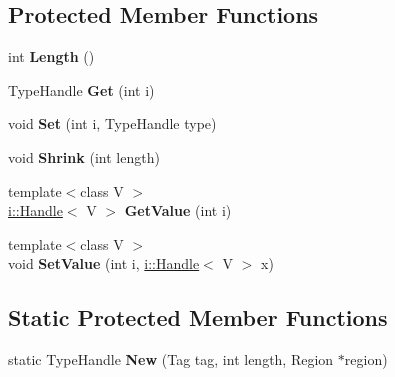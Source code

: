\subsection*{Protected Member Functions}
\begin{DoxyCompactItemize}
\item 
\hypertarget{classv8_1_1internal_1_1_type_impl_1_1_structural_type_a425763509c468842d8493e384ac93500}{}int {\bfseries Length} ()\label{classv8_1_1internal_1_1_type_impl_1_1_structural_type_a425763509c468842d8493e384ac93500}

\item 
\hypertarget{classv8_1_1internal_1_1_type_impl_1_1_structural_type_a2bdaac878b4120bf9585b1ac4092dd19}{}Type\+Handle {\bfseries Get} (int i)\label{classv8_1_1internal_1_1_type_impl_1_1_structural_type_a2bdaac878b4120bf9585b1ac4092dd19}

\item 
\hypertarget{classv8_1_1internal_1_1_type_impl_1_1_structural_type_a4e0a7254cb9d572c00b428c48df92b86}{}void {\bfseries Set} (int i, Type\+Handle type)\label{classv8_1_1internal_1_1_type_impl_1_1_structural_type_a4e0a7254cb9d572c00b428c48df92b86}

\item 
\hypertarget{classv8_1_1internal_1_1_type_impl_1_1_structural_type_a4523eb9f2933f32cba3c1690d0519559}{}void {\bfseries Shrink} (int length)\label{classv8_1_1internal_1_1_type_impl_1_1_structural_type_a4523eb9f2933f32cba3c1690d0519559}

\item 
\hypertarget{classv8_1_1internal_1_1_type_impl_1_1_structural_type_a66f3b95d3bd6d632ba98326227e63b3c}{}{\footnotesize template$<$class V $>$ }\\\hyperlink{classv8_1_1internal_1_1_handle}{i\+::\+Handle}$<$ V $>$ {\bfseries Get\+Value} (int i)\label{classv8_1_1internal_1_1_type_impl_1_1_structural_type_a66f3b95d3bd6d632ba98326227e63b3c}

\item 
\hypertarget{classv8_1_1internal_1_1_type_impl_1_1_structural_type_a1583084c3c331273f00fb04118e0db9e}{}{\footnotesize template$<$class V $>$ }\\void {\bfseries Set\+Value} (int i, \hyperlink{classv8_1_1internal_1_1_handle}{i\+::\+Handle}$<$ V $>$ x)\label{classv8_1_1internal_1_1_type_impl_1_1_structural_type_a1583084c3c331273f00fb04118e0db9e}

\end{DoxyCompactItemize}
\subsection*{Static Protected Member Functions}
\begin{DoxyCompactItemize}
\item 
\hypertarget{classv8_1_1internal_1_1_type_impl_1_1_structural_type_aee7de38570daf15b05f7b9c74079d182}{}static Type\+Handle {\bfseries New} (Tag tag, int length, Region $\ast$region)\label{classv8_1_1internal_1_1_type_impl_1_1_structural_type_aee7de38570daf15b05f7b9c74079d182}

\end{DoxyCompactItemize}
